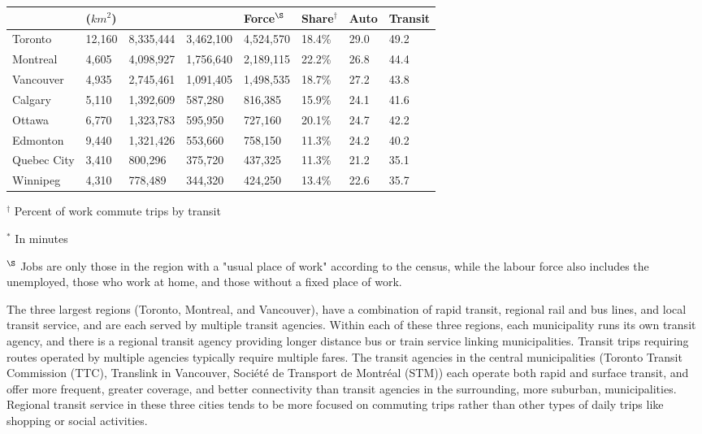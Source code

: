 \documentclass[11 pt, letterpaper]{article}
\begin{document}
{\begin{table}[H]
\begin{adjustwidth}{-.25in}{-.25in}
\begin{tabular}{p{19mm} | p{10mm} p{15mm} p{14mm}  p{14mm} p{21mm} p{12mm} p{12mm}}
			& ($km^{2}$)  &  &       & Force$^\S$ &  Share$^\dagger$  & Auto  & Transit \\
			\hline
			Toronto  & 12,160 & 8,335,444 & 3,462,100 & 4,524,570 & 18.4\%  & 29.0  & 49.2 \\
			Montreal & 4,605 & 4,098,927 & 1,756,640 & 2,189,115 & 22.2\%  &  26.8  & 44.4 \\
			Vancouver  & 4,935 & 2,745,461 & 1,091,405 & 1,498,535 & 18.7\%  & 27.2 & 43.8 \\
			Calgary  & 5,110 & 1,392,609 & 587,280 & 816,385 & 15.9\%  & 24.1 & 41.6 \\
			Ottawa  & 6,770 & 1,323,783  & 595,950 & 727,160 & 20.1\%  & 24.7 & 42.2 \\
			Edmonton & 9,440  & 1,321,426  & 553,660 & 758,150 & 11.3\%  & 24.2  & 40.2  \\
			Quebec City & 3,410  & 800,296 & 375,720  & 437,325 & 11.3\% & 21.2  & 35.1 \\
			Winnipeg & 4,310 & 778,489 & 344,320  & 424,250 & 13.4\%  & 22.6 & 35.7 \\
			
		\end{tabular}
	\end{adjustwidth}
	\vspace{-6mm}
	\begin{flushleft}
		\singlespacing\small{
			$^\dagger$ Percent of work commute trips by transit
			
			$^*$ In minutes
			
			$^\S$ Jobs are only those in the region with a "usual place of work" according to the census, while the labour force also includes the unemployed, those who work at home, and those without a fixed place of work.
		}
		
	\end{flushleft}
\end{table}

The three largest regions (Toronto, Montreal, and Vancouver), have a combination of rapid transit, regional rail and bus lines, and local transit service, and are each served by multiple transit agencies. Within each of these three regions, each municipality runs its own transit agency, and there is a regional transit agency providing longer distance bus or train service linking municipalities. Transit trips requiring routes operated by multiple agencies typically require multiple fares. The transit agencies in the central municipalities (Toronto Transit Commission (TTC), Translink in Vancouver, Soci\'et\'e de Transport de Montr\'eal (STM)) each operate both rapid and surface transit, and offer more frequent, greater coverage, and better connectivity than transit agencies in the surrounding, more suburban, municipalities. Regional transit service in these three cities tends to be more focused on commuting trips rather than other types of daily trips like shopping or social activities.

}
\end{document}
